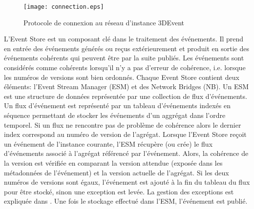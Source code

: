 \begin{figure}[h]
	\noindent
	\centering
	\texttt{[image: connection.eps]}
	\caption{Protocole de connexion au réseau d'instance 3DEvent}
	\label{fig:connexionpairs}
\end{figure}



L'Event Store est un composant clé dans le traitement des événements. Il prend 
en entrée des événements générés ou reçus extérieurement et produit en sortie 
des événements cohérents qui peuvent être par la suite publiés. Les événements 
sont considérés comme cohérents lorsqu'il n'y a pas d'erreur de cohérence, i.e. 
lorsque les numéros de versions sont bien ordonnés. Chaque Event Store contient 
deux éléments: l'Event Stream Manager (ESM) et des Network Bridges (NB). Un
ESM est une structure de données représentée par une collection de flux 
d'événements. Un flux d'événement est représenté par un tableau d'événements 
indexés en séquence permettant de stocker les événements d'un aggrégat dans 
l'ordre temporel. Si un flux ne rencontre pas de problème de cohérence alors le 
dernier index correspond au numéro de version de l'agrégat. Lorsque l'Event Store 
reçoit un événement de l'instance courante, l'ESM récupère (ou crée) le flux d'événements associé à l'agrégat 
référencé par l'événement. Alors, la cohérence de la version est vérifiée en 
comparant la version attendue (exposée dans les métadonnées de l'événement) 
et la version actuelle de l'agrégat. Si les deux numéros de versions sont égaux, 
l'événement est ajouté à la fin du tableau du flux pour être stocké, sinon une 
exception est levée. La gestion des exceptions est expliquée dans . Une fois le stockage effectué dans l'ESM, l'événement est publié.